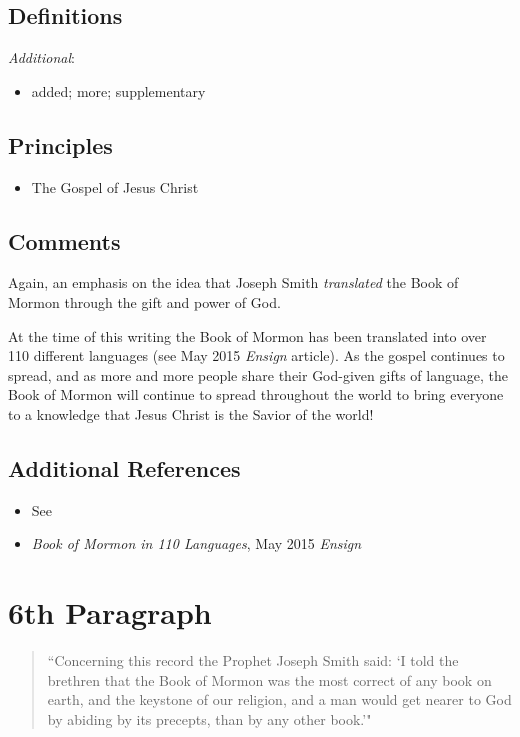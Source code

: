 \documentclass[12pt]{report}
\begin{document}
\subsection{Definitions\label{intro:DFN5}}
\emph{Additional}: \begin{itemize}
\item added; more; supplementary
\end{itemize}
\subsection{Principles\label{intro:principles5}}
\begin{itemize}
\item {} The Gospel of Jesus Christ
\end{itemize}

\subsection{Comments\label{intro:comments5}}
Again, an emphasis on the idea that Joseph Smith \emph{translated} the Book of Mormon through the gift and power of God.

At the time of this writing the Book of Mormon has been translated into over 110 different languages (see May 2015 \emph{Ensign} article).  As the gospel continues to spread, and as more and more people share their God-given gifts of language, the Book of Mormon will continue to spread throughout the world to bring everyone to a knowledge that Jesus Christ is the Savior of the world!

\subsection{Additional References\label{intro:references5}}
\begin{itemize}
\item See 
\item \emph{Book of Mormon in 110 Languages}, May 2015 \emph{Ensign}
\end{itemize}

\section{6th Paragraph\label{intro:6th}}
\begin{center}
\begin{quote}
``Concerning this record the Prophet Joseph Smith said: `I told the brethren that the Book of Mormon was the most correct of any book on earth, and the keystone of our religion, and a man would get nearer to God by abiding by its precepts, than by any other book.'"
\end{quote}
\end{center}
\end{document}
